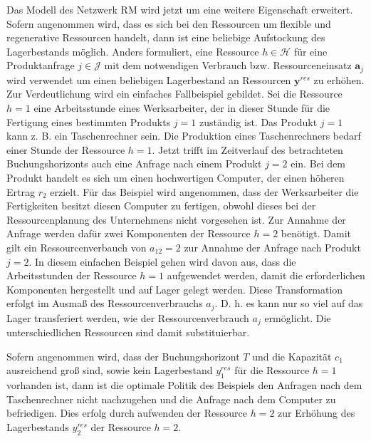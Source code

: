 Das Modell des Netzwerk RM wird jetzt um eine weitere Eigenschaft erweitert. Sofern angenommen wird, dass es sich bei den Ressourcen um flexible und regenerative Ressourcen handelt, dann ist eine beliebige Aufstockung des Lagerbestands möglich. Anders formuliert, eine Ressource $h\in\mathcal{H}$ für eine Produktanfrage $j\in\mathcal{J}$ mit dem notwendigen Verbrauch bzw. Ressourceneinsatz $\textbf{a}_j$ wird verwendet um einen beliebigen Lagerbestand an Ressourcen $\textbf{y}^{res}$ zu erhöhen. Zur Verdeutlichung wird ein einfaches Fallbeispiel gebildet. Sei die Ressource $h=1$ eine Arbeitsstunde eines Werksarbeiter, der in dieser Stunde für die Fertigung eines bestimmten Produkts $j=1$ zuständig ist. Das Produkt $j=1$ kann z. B. ein Taschenrechner sein. Die Produktion eines Taschenrechners bedarf einer Stunde der Ressource $h=1$. Jetzt trifft im Zeitverlauf des betrachteten Buchungshorizonts auch eine Anfrage nach einem Produkt $j=2$ ein. Bei dem Produkt handelt es sich um einen hochwertigen Computer, der einen höheren Ertrag $r_{2}$ erzielt. Für das Beispiel wird angenommen, dass der Werksarbeiter die Fertigkeiten besitzt diesen Computer zu fertigen, obwohl dieses bei der Ressourcenplanung des Unternehmens nicht vorgesehen ist. Zur Annahme der Anfrage werden dafür zwei Komponenten der Ressource $h=2$ benötigt. Damit gilt ein Ressourcenverbauch von $a_12=2$ zur Annahme der Anfrage nach Produkt $j=2$. In diesem einfachen Beispiel gehen wird davon aus, dass die Arbeitsstunden der Ressource $h=1$ aufgewendet werden, damit die erforderlichen Komponenten hergestellt und auf Lager gelegt werden. Diese Transformation erfolgt im Ausmaß des Ressourcenverbrauchs $a_{j}$. D. h. es kann nur so viel auf das Lager transferiert werden, wie der Ressourcenverbrauch $a_{j}$ ermöglicht. Die unterschiedlichen Ressourcen sind damit substituierbar.

Sofern angenommen wird, dass der Buchungshorizont $T$ und die Kapazität $c_1$ ausreichend groß sind, sowie kein Lagerbestand $y^{res}_1$ für die Ressource $h=1$ vorhanden ist, dann ist die optimale Politik des Beispiels den Anfragen nach dem Taschenrechner nicht nachzugehen und die Anfrage nach dem Computer zu befriedigen. Dies erfolg durch aufwenden der Ressource $h=2$ zur Erhöhung des Lagerbestands $y^{res}_{2}$ der Ressource $h=2$.

